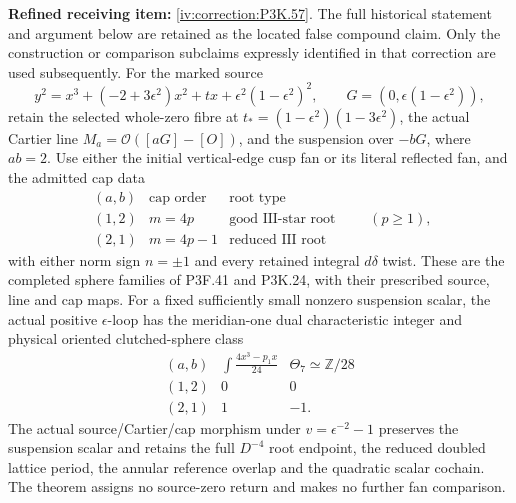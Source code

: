 \begin{theorem}\hypertarget{tag-02V3}{}\label{night:P3K.57}

\par\noindent\textbf{Refined receiving item:} \cref{iv:correction:P3K.57}. The full historical statement and argument below are retained as the located false compound claim. Only the construction or comparison subclaims expressly identified in that correction are used subsequently.
For the marked source
\[
 y^2=x^3+(-2+3\epsilon^2)x^2+t x
       +\epsilon^2(1-\epsilon^2)^2,\qquad
 G=(0,\epsilon(1-\epsilon^2)),
\]
retain the selected whole-zero fibre at
\(t_*=(1-\epsilon^2)(1-3\epsilon^2)\), the actual Cartier line
\(M_a=\mathcal O([aG]-[O])\), and the suspension over \(-bG\),
where \(ab=2\). Use either the initial vertical-edge cusp fan or its
literal reflected fan, and the admitted cap data
\[
 \begin{array}{c|c|c}
 (a,b)&\text{cap order}&\text{root type}\\ \hline
 (1,2)&m=4p&\text{good III-star root}\\
 (2,1)&m=4p-1&\text{reduced III root}
 \end{array}\qquad(p\ge1),
\]
with either norm sign \(n=\pm1\) and every retained integral
\(d\delta\) twist. These are the completed sphere families of
P3F.41 and P3K.24, with their prescribed source, line and cap maps.
For a fixed sufficiently small nonzero suspension scalar, the actual
positive \(\epsilon\)-loop has the meridian-one dual characteristic integer and physical oriented
clutched-sphere class
\[
 \begin{array}{c|c|c}
 (a,b)&\displaystyle\int\frac{4x^3-p_1x}{24}
       &\Theta_7\simeq\mathbb Z/28\\ \hline
 (1,2)&0&0\\
 (2,1)&1&-1.
 \end{array}
\]
The actual source/Cartier/cap morphism under
\(v=\epsilon^{-2}-1\) preserves the suspension scalar and retains
the full \(D^{-4}\) root endpoint, the reduced doubled lattice period,
the annular reference overlap and the quadratic scalar cochain.
The theorem assigns no source-zero return and makes no further fan comparison.
\end{theorem}

